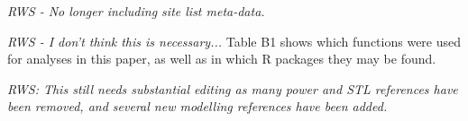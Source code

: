 \documentclass{ametsoc}
\begin{document}
%
\emph{RWS - No longer including site list meta-data.}

\emph{RWS - I don't think this is necessary...}
\appendix[A]
Table B1 shows which functions were used for analyses in this paper, as well as in which R packages they may be found.

%
\emph{RWS: This still needs substantial editing as many power and STL references have been removed, and several new modelling references have been added.}
\end{document}
